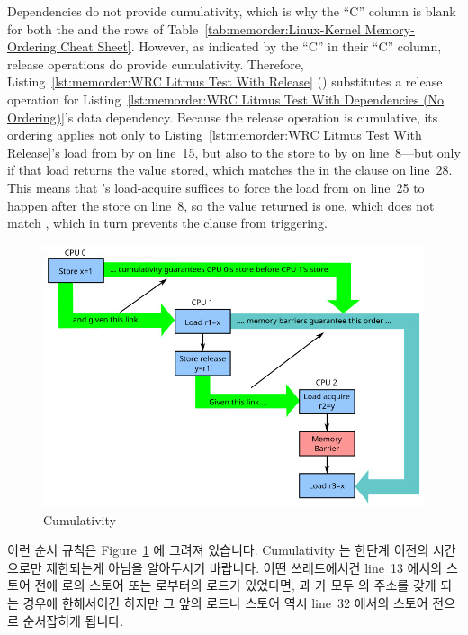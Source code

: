 Dependencies do not provide cumulativity,
which is why the ``C'' column is blank for
both the  and the  rows
of Table~\ref{tab:memorder:Linux-Kernel Memory-Ordering Cheat Sheet}.
However, as indicated by the ``C'' in their ``C'' column,
release operations do provide cumulativity.
Therefore,
Listing~\ref{lst:memorder:WRC Litmus Test With Release}
()
substitutes a release operation for
Listing~\ref{lst:memorder:WRC Litmus Test With Dependencies (No Ordering)}'s
data dependency.
Because the release operation is cumulative, its ordering applies not only to
Listing~\ref{lst:memorder:WRC Litmus Test With Release}'s
load from  by  on line~15, but also to the store to 
by  on line~8---but only if that load returns the value stored,
which matches the  in the  clause on line~28.
This means that 's load-acquire suffices to force the
load from  on line~25 to happen after the store on line~8, so
the value returned is one, which does not match , which
in turn prevents the  clause from triggering.
\fi

\begin{figure}[htbp]
\centering
\includegraphics{memorder/memorybarriercum}
\caption{Cumulativity}
\label{fig:memorder:Cumulativity}
\end{figure}

이런 순서 규칙은
Figure~\ref{fig:memorder:Cumulativity} 에 그려져 있습니다.
Cumulativity 는 한단계 이전의 시간으로만 제한되는게 아님을 알아두시기 바랍니다.
어떤 쓰레드에서건 line~13 에서의 스토어 전에  로의 스토어 또는 
로부터의 로드가 있었다면,  과  가 모두  의 주소를 갖게 되는
경우에 한해서이긴 하지만 그 앞의 로드나 스토어 역시 line~32 에서의 스토어
전으로 순서잡히게 됩니다.

